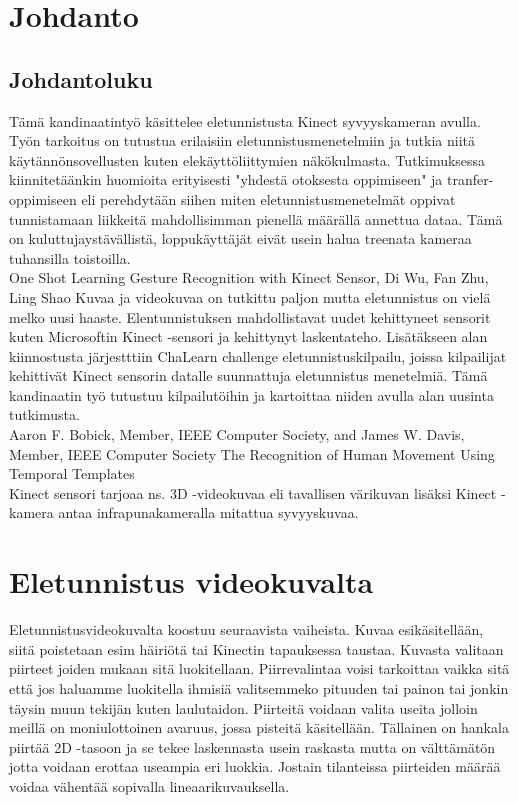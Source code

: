
\section{Johdanto}



\subsection{Johdantoluku}

Tämä kandinaatintyö käsittelee eletunnistusta Kinect syvyyskameran avulla. 
Työn tarkoitus on tutustua erilaisiin eletunnistusmenetelmiin ja tutkia niitä käytännönsovellusten kuten
elekäyttöliittymien näkökulmasta. Tutkimuksessa kiinnitetäänkin huomioita erityisesti "yhdestä otoksesta oppimiseen" 
ja tranfer-oppimiseen eli perehdytään siihen miten eletunnistusmenetelmät oppivat tunnistamaan liikkeitä mahdollisimman
pienellä määrällä annettua dataa. Tämä on kuluttujaystävällistä, loppukäyttäjät eivät usein halua treenata kameraa tuhansilla toistoilla.\\
One Shot Learning Gesture Recognition with Kinect Sensor, Di Wu, Fan Zhu, Ling Shao
Kuvaa ja videokuvaa on tutkittu paljon mutta eletunnistus on vielä melko uusi haaste. Elentunnistuksen mahdollistavat uudet kehittyneet
sensorit kuten Microsoftin Kinect -sensori ja kehittynyt laskentateho. Lisätäkseen alan kiinnostusta järjestttiin ChaLearn challenge
eletunnistuskilpailu, joissa kilpailijat kehittivät Kinect sensorin datalle suunnattuja eletunnistus menetelmiä. Tämä kandinaatin työ 
tutustuu kilpailutöihin ja kartoittaa niiden avulla alan uusinta tutkimusta.\\
Aaron F. Bobick, Member, IEEE Computer Society, and
James W. Davis, Member, IEEE Computer Society
The Recognition of Human Movement Using Temporal Templates\\
Kinect sensori tarjoaa ns. 3D -videokuvaa eli tavallisen värikuvan lisäksi Kinect -kamera antaa infrapunakameralla mitattua syvyyskuvaa.


\section{Eletunnistus videokuvalta}
\label{Eletunnistus videokuvalta}

Eletunnistusvideokuvalta koostuu seuraavista vaiheista. Kuvaa esikäsitellään, siitä poistetaan esim häiriötä tai Kinectin tapauksessa taustaa.
Kuvasta valitaan piirteet joiden mukaan sitä luokitellaan. Piirrevalintaa voisi tarkoittaa vaikka sitä että jos haluamme luokitella ihmisiä 
valitsemmeko pituuden tai painon tai jonkin täysin muun tekijän kuten laulutaidon. Piirteitä voidaan valita useita
jolloin meillä on moniulottoinen avaruus, jossa pisteitä käsitellään. Tällainen on hankala piirtää 2D -tasoon ja se tekee laskennasta usein raskasta
mutta on välttämätön jotta voidaan erottaa useampia eri luokkia. Jostain tilanteissa piirteiden määrää voidaa vähentää sopivalla lineaarikuvauksella.\\

